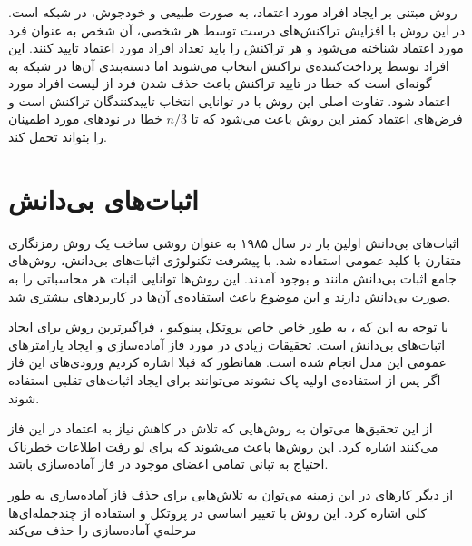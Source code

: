 \subsubsection{}
 روش 
\cite{scp}
 مبتنی بر ایجاد افراد مورد اعتماد، به صورت طبیعی و خودجوش، در شبکه است. در این روش با افزایش تراکنش‌های درست توسط هر شخصی، آن شخص به عنوان فرد مورد اعتماد شناخته می‌شود و هر تراکنش را باید تعداد افراد مورد اعتماد تایید کنند. این افراد توسط پرداخت‌کننده‌ی تراکنش انتخاب می‌شوند اما دسته‌بندی آن‌ها در شبکه‌ به گونه‌ای است که خطا در تایید تراکنش باعث حذف شدن فرد از لیست افراد مورد اعتماد شود. تفاوت اصلی این روش با 
 در توانایی انتخاب تاییدکنندگان تراکنش است و فرض‌های اعتماد کمتر این روش باعث می‌شود که تا $ n /3 $ خطا در نود‌های مورد اطمینان را بتواند تحمل کند.
\section{اثبات‌های بی‌دانش}
اثبات‌های بی‌دانش اولین بار در سال ۱۹۸۵ 
\cite{GHY}
به عنوان روشی ساخت یک روش رمزنگاری متقارن با کلید عمومی استفاده شد. با پیشرفت تکنولوژی اثبات‌های بی‌دانش،‌ روش‌های جامع اثبات بی‌دانش مانند
\cite{zksnark}
و  
\cite{zkstark}
بوجود آمدند. این روش‌ها توانایی اثبات هر محاسباتی را به صورت بی‌دانش دارند و این موضوع باعث استفاده‌ی آن‌ها در کاربردهای بیشتری شد.
\par
با توجه به این که 
، به طور خاص خاص پروتکل پینوکیو
،
فراگیرترین روش برای ایجاد اثبات‌های بی‌دانش است. تحقیقات زیادی در مورد فاز آماده‌سازی و ایجاد پارامترهای عمومی این مدل انجام شده است. همانطور که قبلا اشاره کردیم ورودی‌های این فاز اگر پس از استفاده‌ی اولیه پاک نشوند می‌توانند برای ایجاد اثبات‌های تقلبی استفاده شوند.
\par
از این تحقیق‌ها می‌توان به روش‌هایی
\cite{znsetup} \cite{multipartyparams}
که تلاش در کاهش نیاز به اعتماد در این فاز می‌کنند اشاره کرد. این روش‌ها باعث می‌شوند که برای لو رفت اطلاعات خطرناک احتیاج به تبانی تمامی اعضای موجود در فاز آماده‌سازی باشد.
\par
از دیگر کارهای در این زمینه می‌توان به تلاش‌هایی برای حذف فاز آماده‌سازی به طور کلی اشاره کرد. این روش‌ با تغییر اساسی در پروتکل و استفاده از چندجمله‌ای‌ها 
\cite{nosetup}
مرحله‌ي آماده‌سازی را حذف می‌کند
